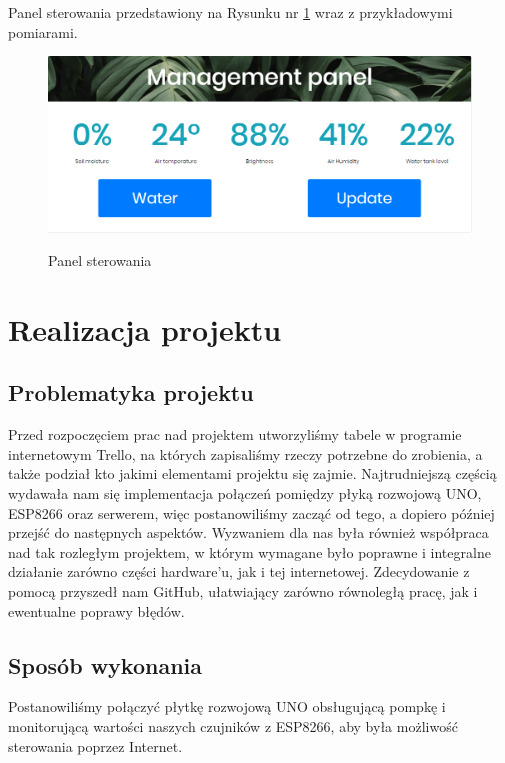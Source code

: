 \documentclass[12pt]{article}
\begin{document}
Panel sterowania przedstawiony na Rysunku nr \ref{fig:panel} wraz z przykładowymi pomiarami.
\begin{figure}[!h]
	\begin{center}
		{\includegraphics[width=16cm]{front panel.png}}
	\end{center}
	\caption{Panel sterowania}
	\label{fig:panel}
\end{figure}

\newpage

\section{Realizacja projektu}
\subsection{Problematyka projektu}
Przed rozpoczęciem prac nad projektem utworzyliśmy tabele w programie internetowym Trello, na których zapisaliśmy rzeczy potrzebne do zrobienia, a także podział kto jakimi elementami projektu się zajmie. Najtrudniejszą częścią wydawała nam się implementacja połączeń pomiędzy płyką rozwojową UNO, ESP8266 oraz serwerem, więc postanowiliśmy zacząć od tego, a dopiero później przejść do następnych aspektów. Wyzwaniem dla nas była również współpraca nad tak rozległym projektem, w którym wymagane było poprawne i integralne działanie zarówno części hardware'u, jak i tej internetowej. Zdecydowanie z pomocą przyszedł nam GitHub, ułatwiający zarówno równoległą pracę, jak i ewentualne poprawy błędów. 

\subsection{Sposób wykonania}


Postanowiliśmy połączyć płytkę rozwojową UNO obsługującą pompkę i monitorującą wartości naszych czujników z ESP8266, aby była możliwość sterowania poprzez Internet.
\end{document}
